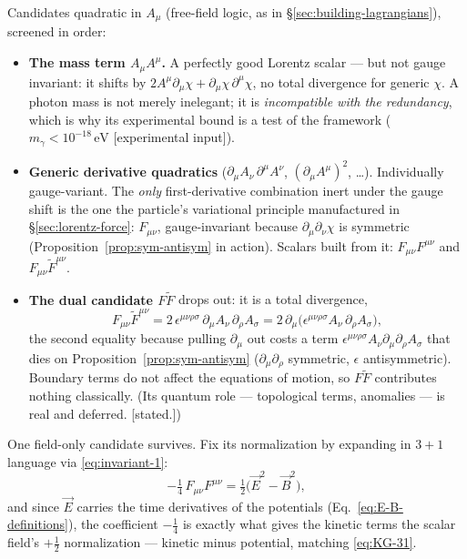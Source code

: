 \documentclass[11pt]{article}
\theoremstyle{plain}
\theoremstyle{definition}
\theoremstyle{remark}
\newcommand{\vE}{\vec{E}}
\newcommand{\vB}{\vec{B}}
\begin{document}
Candidates quadratic in $A_\mu$ (free-field logic, as in
\S\ref{sec:building-lagrangians}), screened in order:
\begin{itemize}
  \item \textbf{The mass term $A_\mu A^\mu$.} A perfectly good Lorentz
  scalar --- but not gauge invariant: it shifts by
  $2A^\mu\partial_\mu\chi + \partial_\mu\chi\,\partial^\mu\chi$, no
  total divergence for generic $\chi$. A photon mass is not merely
  inelegant; it is \emph{incompatible with the redundancy}, which is
  why its experimental bound is a test of the framework
  ($m_\gamma < 10^{-18}\,\mathrm{eV}$ [experimental input]).
  \item \textbf{Generic derivative quadratics}
  ($\partial_\mu A_\nu\,\partial^\mu A^\nu$,
  $(\partial_\mu A^\mu)^2$, \dots). Individually gauge-variant. The
  \emph{only} first-derivative combination inert under the gauge
  shift is the one the particle's variational principle manufactured
  in \S\ref{sec:lorentz-force}: $F_{\mu\nu}$, gauge-invariant because
  $\partial_\mu\partial_\nu\chi$ is symmetric
  (Proposition~\ref{prop:sym-antisym} in action). Scalars built from
  it: $F_{\mu\nu}F^{\mu\nu}$ and $F_{\mu\nu}\tilde F^{\mu\nu}$.
  \item \textbf{The dual candidate $F\tilde F$} drops out:
  it is a total divergence,
  \begin{equation}
    F_{\mu\nu}\tilde F^{\mu\nu}
    = 2\,\epsilon^{\mu\nu\rho\sigma}\,
      \partial_\mu A_\nu\,\partial_\rho A_\sigma
    = 2\,\partial_\mu\!\bigl(
        \epsilon^{\mu\nu\rho\sigma} A_\nu\,\partial_\rho A_\sigma
      \bigr),
  \end{equation}
  the second equality because pulling $\partial_\mu$ out costs a term
  $\epsilon^{\mu\nu\rho\sigma}A_\nu\partial_\mu\partial_\rho A_\sigma$
  that dies on Proposition~\ref{prop:sym-antisym}
  ($\partial_\mu\partial_\rho$ symmetric, $\epsilon$ antisymmetric).
  Boundary terms do not affect the equations of motion, so
  $F\tilde F$ contributes nothing classically.
  (Its quantum role --- topological terms, anomalies --- is real
  and deferred. [stated.])
\end{itemize}
One field-only candidate survives. Fix its normalization by
expanding in $3{+}1$ language via \eqref{eq:invariant-1}:
\begin{equation}
  -\tfrac14\, F_{\mu\nu}F^{\mu\nu}
  = \tfrac12\bigl(\vE^2 - \vB^2\bigr),
\end{equation}
and since $\vE$ carries the time derivatives of the potentials
(Eq.~\eqref{eq:E-B-definitions}), the coefficient $-\tfrac14$ is
exactly what gives the kinetic terms the scalar field's $+\tfrac12$
normalization --- kinetic minus potential, matching
\eqref{eq:KG-31}.
\end{document}
